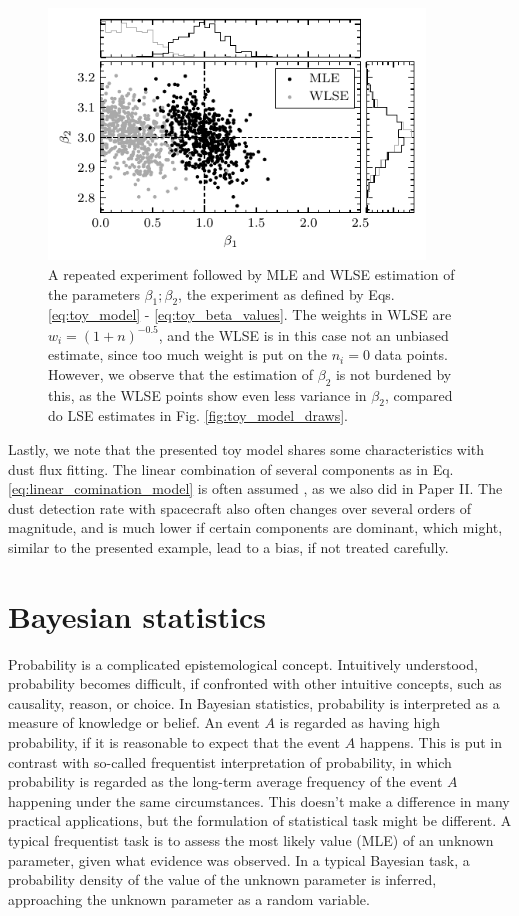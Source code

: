 \begin{figure}[h]
 	\centering
 	\includegraphics[width=10cm]{figures/toy_model_draws_weighted.pdf}
 	\caption{A repeated experiment followed by MLE and WLSE estimation of the parameters $\beta_1; \beta_2$, the experiment as defined by Eqs. \ref{eq:toy_model} - \ref{eq:toy_beta_values}. The weights in WLSE are $w_i = (1+n)^{-0.5}$, and the WLSE is in this case not an unbiased estimate, since too much weight is put on the $n_i=0$ data points. However, we observe that the estimation of $\beta_2$ is not burdened by this, as the WLSE points show even less variance in $\beta_2$, compared do LSE estimates in Fig. \ref{fig:toy_model_draws}.}
 	\label{fig:toy_model_draws_weighted}
\end{figure}

Lastly, we note that the presented toy model shares some characteristics with dust flux fitting. The linear combination of several components as in Eq. \ref{eq:linear_comination_model} is often assumed \citep{szalay2021collisional,zaslavsky2012interplanetary}, as we also did in Paper II. The dust detection rate with spacecraft also often changes over several orders of magnitude, and is much lower if certain components are dominant, which might, similar to the presented example, lead to a bias, if not treated carefully. 

\section{Bayesian statistics}

Probability is a complicated epistemological concept. Intuitively understood, probability becomes difficult, if confronted with other intuitive concepts, such as causality, reason, or choice. In Bayesian statistics, probability is interpreted as a measure of knowledge or belief. An event $A$ is regarded as having high probability, if it is reasonable to expect that the event $A$ happens. This is put in contrast with so-called frequentist interpretation of probability, in which probability is regarded as the long-term average frequency of the event $A$ happening under the same circumstances. This doesn't make a difference in many practical applications, but the formulation of statistical task might be different. A typical frequentist task is to assess the most likely value (MLE) of an unknown parameter, given what evidence was observed. In a typical Bayesian task, a probability density of the value of the unknown parameter is inferred, approaching the unknown parameter as a random variable.  

